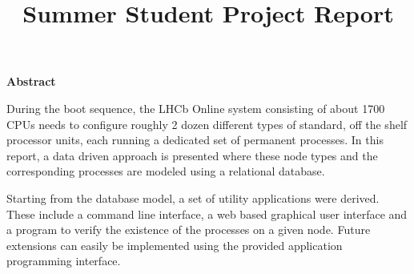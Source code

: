 \documentclass{customization}
\title{Summer Student Project Report}
\begin{document}




        
\fairemarges 
\fairepagedegarde 

\begin{Large}
\centerline{\textbf{Abstract}}
\end{Large}
\vspace{0.5cm}



During the boot sequence, the LHCb Online system consisting of about 1700 CPUs needs to configure roughly 2 dozen different types of standard, off the shelf processor units, each running a dedicated set of permanent processes. In this report, a data driven approach is presented where these node types and the corresponding processes are modeled using a relational database.
\newline

\noindent
Starting from the database model, a set of utility applications were derived. These include a command line interface, a web based graphical user interface and a program to verify the existence of the processes on a given node. Future extensions can easily be implemented using the provided application programming interface. 

\end{document}
